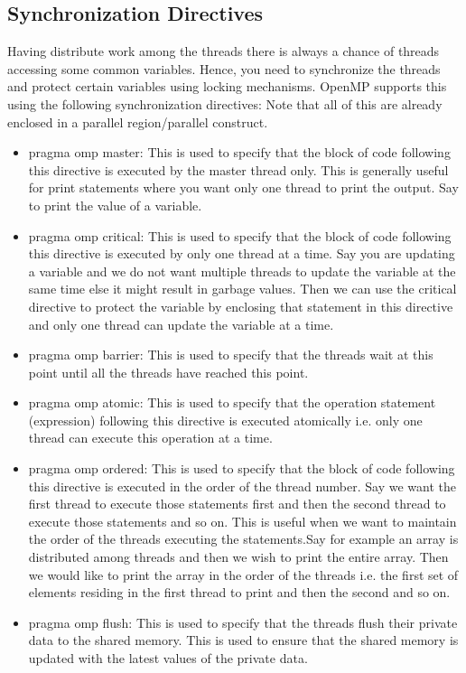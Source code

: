 \documentclass[12pt]{article}
\begin{document}
\subsection{Synchronization Directives}
Having distribute work among the threads there is always a chance of threads accessing some common variables. Hence, you need to synchronize the threads 
and protect certain variables using locking mechanisms.
OpenMP supports this using the following synchronization directives:
Note that all of this are already enclosed in a parallel region/parallel construct.
\begin{itemize}
    \item pragma omp master: This is used to specify that the block of code following this directive is executed by the master thread only.
    This is generally useful for print statements where you want only one thread to print the output. Say to print the value of a variable.
    \item pragma omp critical: This is used to specify that the block of code following this directive is executed by only one thread at a time.
    Say you are updating a variable and we do not want multiple threads to update the variable at the same time else it might result in garbage values.
    Then we can use the critical directive to protect the variable by enclosing that statement in this directive and only one thread can update the variable at a time.
    \item pragma omp barrier: This is used to specify that the threads wait at this point until all the threads have reached this point.
    \item pragma omp atomic: This is used to specify that the operation statement (expression) following this directive is executed atomically i.e. only one thread can execute this operation at a time.
    \item pragma omp ordered: This is used to specify that the block of code following this directive is executed in the order of the thread number. Say we want the first thread to execute those statements first and then the second thread to execute those statements and so on.
    This is useful when we want to maintain the order of the threads executing the statements.Say for example an array is distributed among threads and then we wish to print the entire array. Then we would like to print the array in the order of the threads i.e. the first set of elements residing in the first thread to print and then the second and so on.
    \item pragma omp flush: This is used to specify that the threads flush their private data to the shared memory. This is used to ensure that the shared memory is updated with the latest values of the private data.

\end{itemize}
\end{document}

